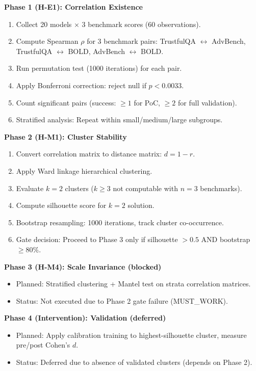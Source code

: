 \textbf{Phase 1 (H-E1): Correlation Existence}
\begin{enumerate}
\item Collect 20 models $\times$ 3 benchmark scores (60 observations).
\item Compute Spearman $\rho$ for 3 benchmark pairs: TrustfulQA $\leftrightarrow$ AdvBench, TrustfulQA $\leftrightarrow$ BOLD, AdvBench $\leftrightarrow$ BOLD.
\item Run permutation test (1000 iterations) for each pair.
\item Apply Bonferroni correction: reject null if $p < 0.0033$.
\item Count significant pairs (success: $\geq 1$ for PoC, $\geq 2$ for full validation).
\item Stratified analysis: Repeat within small/medium/large subgroups.
\end{enumerate}

\textbf{Phase 2 (H-M1): Cluster Stability}
\begin{enumerate}
\item Convert correlation matrix to distance matrix: $d = 1 - r$.
\item Apply Ward linkage hierarchical clustering.
\item Evaluate $k=2$ clusters ($k \geq 3$ not computable with $n=3$ benchmarks).
\item Compute silhouette score for $k=2$ solution.
\item Bootstrap resampling: 1000 iterations, track cluster co-occurrence.
\item Gate decision: Proceed to Phase 3 only if silhouette $> 0.5$ AND bootstrap $\geq 80\%$.
\end{enumerate}

\textbf{Phase 3 (H-M4): Scale Invariance (blocked)}
\begin{itemize}
\item Planned: Stratified clustering + Mantel test on strata correlation matrices.
\item Status: Not executed due to Phase 2 gate failure (MUST\_WORK).
\end{itemize}

\textbf{Phase 4 (Intervention): Validation (deferred)}
\begin{itemize}
\item Planned: Apply calibration training to highest-silhouette cluster, measure pre/post Cohen's $d$.
\item Status: Deferred due to absence of validated clusters (depends on Phase 2).
\end{itemize}

